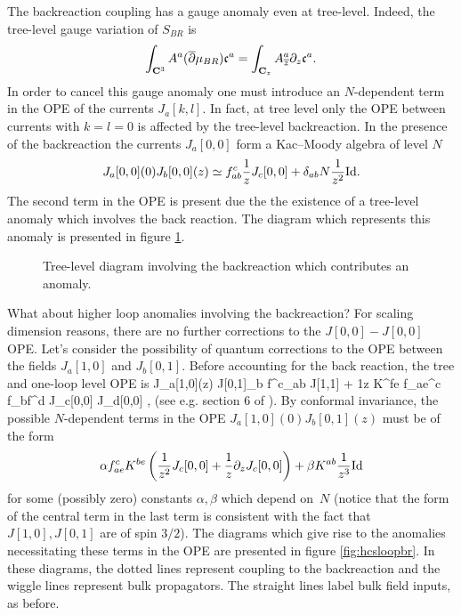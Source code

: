 \documentclass[../main.tex]{subfiles}
\begin{document}
The backreaction coupling has a gauge anomaly even at tree-level.
Indeed, the tree-level gauge variation of $S_{BR}$ is
\[
\int_{\mathbf{C}^3} A^a (\overline{\partial} \mu_{BR}) \mathfrak{c}^a = \int_{\mathbf{C}_z} A_{{\overline{z}}}^a \partial_z \mathfrak{c}^a .
\]
In order to cancel this gauge anomaly one must introduce an $N$-dependent term in the OPE of the currents $J_a[k,l]$. 
In fact, at tree level only the OPE between currents with $k=l=0$ 
is affected by the tree-level backreaction.
In the presence of the backreaction the currents $J_a[0,0]$ form a Kac--Moody algebra of level $N$
\[
J_a[0,0] (0) J_b [0,0] (z) \simeq f_{ab}^c \frac1z J_c[0,0] + \delta_{ab} N \frac1{z^2} {\rm Id} .
\]
The second term in the OPE is present due the the existence of a tree-level anomaly which involves the back reaction.
The diagram which represents this anomaly is presented in figure \ref{fig:hcstreebr}.

\begin{figure}
	\label{fig:hcstreebr}
	\caption{Tree-level diagram involving the backreaction which contributes an anomaly.}  
\end{figure}

What about higher loop anomalies involving the backreaction?
For scaling dimension reasons, there are no further corrections to the $J[0,0]-J[0,0]$ OPE.
Let's consider the possibility of quantum corrections to the OPE between the fields $J_a[1,0]$ and $J_b[0,1]$. 
Before accounting for the back reaction, the tree and one-loop level OPE is 
\beqn\label{eqn:Jbr}
J_a[1,0](z) J[0,1]_b \simeq {} f^c_{ab} J[1,1] + \hbar \frac1z K^{fe} f_{ae}^c f_{bf}^d J_c[0,0] J_d[0,0] ,
\eeqn
(see e.g. section 6 of \cite{CP}).
By conformal invariance, the possible $N$-dependent terms in the OPE $J_a[1,0] (0) J_b [0,1](z)$ must be of the form
\[
\alpha f^c_{ae} K^{be}  \left(\frac{1}{z^2} J_c[0,0] + \frac{1}{z} \partial_z J_c[0,0] \right) + \beta K^{ab} \frac{1}{z^3} {\rm Id} 
\]
for some (possibly zero) constants $\alpha,\beta$ which depend on~$N$
(notice that the form of the central term in the last term is consistent with the fact that $J[1,0], J[0,1]$ are of spin $3/2$).
The diagrams which give rise to the anomalies necessitating these terms in the OPE are presented in figure \ref{fig:hcsloopbr}.
In these diagrams, the dotted lines represent coupling to the backreaction and the wiggle lines represent bulk propagators.
The straight lines label bulk field inputs, as before.
\end{document}
